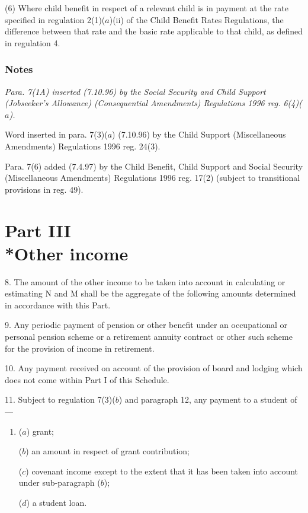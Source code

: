 \documentclass[a4paper]{article}
\newcommand{\parthead}{}
\newcommand\amendment[1]{\subsubsection*{Notes}{\itshape\frenchspacing\footnotesize #1 \par\goodbreak}}
\begin{document}
(6) Where child benefit in respect of a relevant child is in payment at the rate specified in regulation 2(1)($a$)(ii) of the Child Benefit Rates Regulations, the difference between that rate and the basic rate applicable to that child, as defined in regulation 4.

\amendment{
Para. 7(1A) inserted (7.10.96) by the Social Security and Child Support (Jobseeker's Allowance) (Consequential Amendments) Regulations 1996 reg. 6(4)($a$).

Word inserted in para. 7(3)($a$) (7.10.96) by the Child Support (Miscellaneous Amendments) Regulations 1996 reg. 24(3).

Para. 7(6) added (7.4.97) by the Child Benefit, Child Support and Social Security (Miscellaneous Amendments) Regulations 1996 reg. 17(2) (subject to transitional provisions in reg. 49).

}

\section[Part III --- Other income]{Part III\\*Other income}

\renewcommand\parthead{--- Schedule 1 Part III}

8.  The amount of the other income to be taken into account in calculating or estimating N and M shall be the aggregate of the following amounts determined in accordance with this Part.

\medskip

9.  Any periodic payment of pension or other benefit under an occupational or personal pension scheme or a retirement annuity contract or other such scheme for the provision of income in retirement.

\medskip

10.  Any payment received on account of the provision of board and lodging which does not come within Part I of this Schedule.

\medskip

11.  Subject to regulation 7(3)($b$) and paragraph 12, any payment to a student of—
\begin{enumerate}\item[]
($a$) grant;

($b$) an amount in respect of grant contribution;

($c$) covenant income except to the extent that it has been taken into account under sub-paragraph ($b$);

($d$) a student loan.
\end{enumerate}
\end{document}
